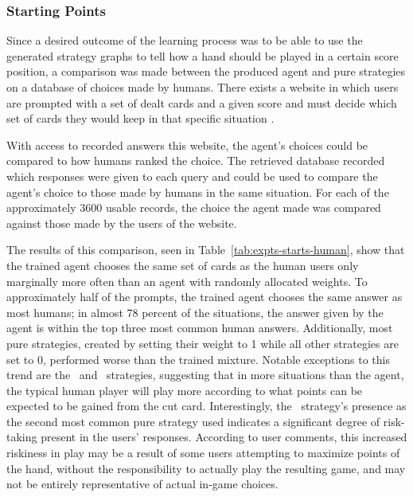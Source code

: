 

\subsubsection*{Starting Points}
\label{sec:findings-expts-starts}

Since a desired outcome of the learning process was to be able to use the
generated strategy graphs to tell how a hand should be played in a
certain score position,
a comparison was made between the produced agent and pure strategies
on a database of choices made by humans.
%
There exists a website in which users are prompted with a set of dealt cards and
a given score and must decide which set of cards they would keep in that
specific situation
\cite{dailycribbagehand}.

With access to recorded answers this website,
the agent's choices could be compared to how humans ranked the choice.
%
The retrieved database recorded which responses were given to each query
and could be used to compare the agent's choice
to those made by humans in the same situation.
%
For each of the approximately 3600 usable records,
the choice the agent made was compared against those made by the users of the
website.

The results of this comparison,
seen in Table~\ref{tab:expts-starts-human}, %
show that the trained agent chooses the same
set of cards as the human users only marginally more often than an agent with 
randomly allocated weights.
%
To approximately half of the prompts,
the trained agent chooses the same answer as most humans;
in almost 78 percent of the situations,
the answer given by the agent is within the top three most common human answers.
%
Additionally,
most pure strategies,
created by setting their weight to 1 while all other strategies are set to 0,
performed worse than the trained mixture.
%
Notable exceptions to this trend are the \handmaxposs\ and \handmaxavg\ 
strategies,
suggesting that in more situations than the agent,
the typical human player will play more according to what points can be expected
to be gained from the cut card.
%
Interestingly,
the \handmaxposs\ strategy's presence as the second most common pure strategy
used indicates a significant degree of risk-taking present in the users'
responses.
%
According to user comments,
this increased riskiness in play
may be a result of some users attempting to maximize points of the hand,
without the responsibility to actually play the resulting game,
and may not be entirely representative of actual in-game choices.

